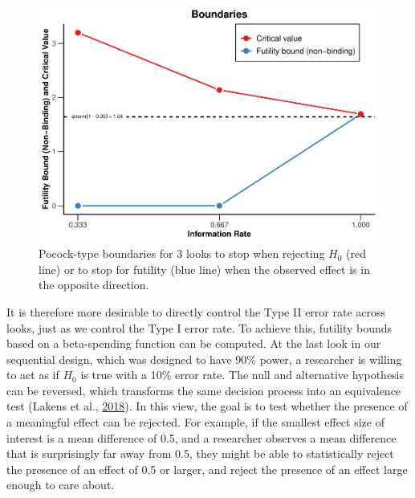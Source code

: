 \documentclass[
  english,
  ,man,floatsintext]{apa6}
\begin{document}
\begin{figure}
\centering
\includegraphics{sequential_tutorial_files/figure-latex/futility1-1.pdf}
\caption{\label{fig:futility1}Pocock-type boundaries for 3 looks to stop when rejecting \(H_0\) (red line) or to stop for futility (blue line) when the observed effect is in the opposite direction.}
\end{figure}

It is therefore more desirable to directly control the Type II error rate across looks, just as we control the Type I error rate. To achieve this, futility bounds based on a beta-spending function can be computed. At the last look in our sequential design, which was designed to have 90\% power, a researcher is willing to act as if \(H_0\) is true with a 10\% error rate. The null and alternative hypothesis can be reversed, which transforms the same decision process into an equivalence test (Lakens et al., \protect\hyperlink{ref-lakens_equivalence_2018}{2018}). In this view, the goal is to test whether the presence of a meaningful effect can be rejected. For example, if the smallest effect size of interest is a mean difference of 0.5, and a researcher observes a mean difference that is surprisingly far away from 0.5, they might be able to statistically reject the presence of an effect of 0.5 or larger, and reject the presence of an effect large enough to care about.
\end{document}
